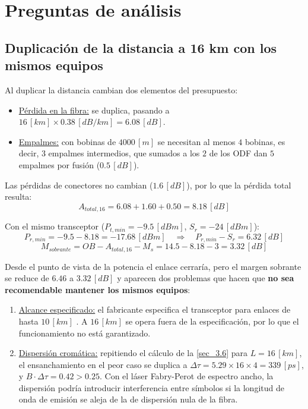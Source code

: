 \section{Preguntas de análisis}
\label{sec_5}

\subsection{Duplicación de la distancia a 16 km con los mismos equipos}
\label{sec_5.1}
Al duplicar la distancia cambian dos elementos del presupuesto:
\begin{itemize}
    \item \underline{Pérdida en la fibra:} se duplica, pasando a $16 \, [km] \times 0.38 \, [dB/km] = 6.08 \, [dB]$.
    \item \underline{Empalmes:} con bobinas de $4000 \, [m]$ se necesitan al menos $4$ bobinas, es decir, $3$ empalmes intermedios, que sumados a los $2$ de los ODF dan $5$ empalmes por fusión ($0.5 \, [dB]$).
\end{itemize}

Las pérdidas de conectores no cambian ($1.6 \, [dB]$), por lo que la pérdida total resulta:
\begin{equation}
    A_{total,16} = 6.08 + 1.60 + 0.50 = 8.18 \, [dB]
    \label{eq_d1}
\end{equation}

Con el mismo transceptor ($P_{t,min} = -9.5 \, [dBm]$, $S_r = -24 \, [dBm]$):
\begin{equation}
    P_{r,min} = -9.5 - 8.18 = -17.68 \, [dBm] \quad \Rightarrow \quad P_{r,min} - S_{r} = 6.32 \, [dB]
    \label{eq_d2}
\end{equation}
\begin{equation}
    M_{sobrante} = OB - A_{total,16} - M_s = 14.5 - 8.18 - 3 = 3.32 \, [dB]
    \label{eq_d3}
\end{equation}

Desde el punto de vista de la potencia el enlace cerraría, pero el margen sobrante se reduce de $6.46$ a $3.32 \, [dB]$ y aparecen dos problemas que hacen que \textbf{no sea recomendable mantener los mismos equipos}:
\begin{enumerate}
    \item \underline{Alcance especificado:} el fabricante especifica el transceptor para enlaces de hasta $10 \, [km]$ \cite{b1}. A $16 \, [km]$ se opera fuera de la especificación, por lo que el funcionamiento no está garantizado.
    \item \underline{Dispersión cromática:} repitiendo el cálculo de la \autoref{sec_3.6} para $L = 16 \, [km]$, el ensanchamiento en el peor caso se duplica a $\Delta\tau = 5.29 \times 16 \times 4 = 339 \, [ps]$, y $B \cdot \Delta\tau = 0.42 > 0.25$. Con el láser Fabry-Perot de espectro ancho, la dispersión podría introducir interferencia entre símbolos si la longitud de onda de emisión se aleja de la de dispersión nula de la fibra.
\end{enumerate}

